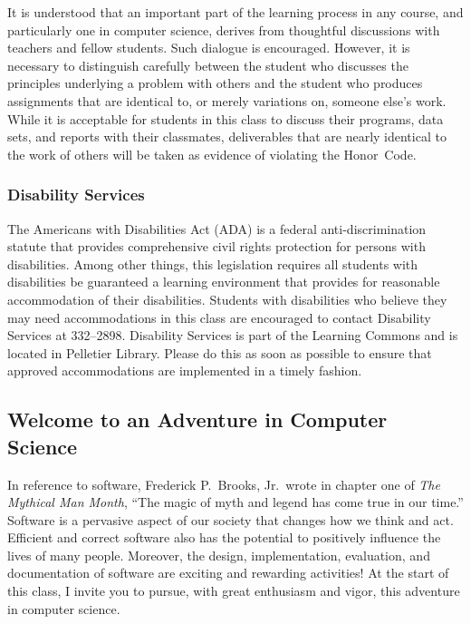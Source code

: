 \noindent It is understood that an important part of the learning process in any course, and particularly one in
computer science, derives from thoughtful discussions with teachers and fellow students.  Such dialogue is encouraged.
However, it is necessary to distinguish carefully between the student who discusses the principles underlying a problem
with others and the student who produces assignments that are identical to, or merely variations on, someone else's
work.  While it is acceptable for students in this class to discuss their programs, data sets, and reports with their
classmates, deliverables that are nearly identical to the work of others will be taken as evidence of violating the
\mbox{Honor Code}.

\subsubsection*{Disability Services}

The Americans with Disabilities Act (ADA) is a federal anti-discrimination statute that provides comprehensive civil
rights protection for persons with disabilities.  Among other things, this legislation requires all students with
disabilities be guaranteed a learning environment that provides for reasonable accommodation of their disabilities.
Students with disabilities who believe they may need accommodations in this class are encouraged to contact Disability
Services at 332--2898.  Disability Services is part of the Learning Commons and is located in Pelletier Library.
Please do this as soon as possible to ensure that approved accommodations are implemented in a timely fashion.

\subsection*{Welcome to an Adventure in Computer Science}

In reference to software, Frederick P.\ Brooks, Jr.\ wrote in chapter one of {\em The Mythical Man Month}, ``The magic
of myth and legend has come true in our time.'' Software is a pervasive aspect of our society that changes how we think
and act.  Efficient and correct software also has the potential to positively influence the lives of many people.
Moreover, the design, implementation, evaluation, and documentation of software are exciting and rewarding activities!
At the start of this class, I invite you to pursue, with great enthusiasm and vigor, this adventure in computer science.


